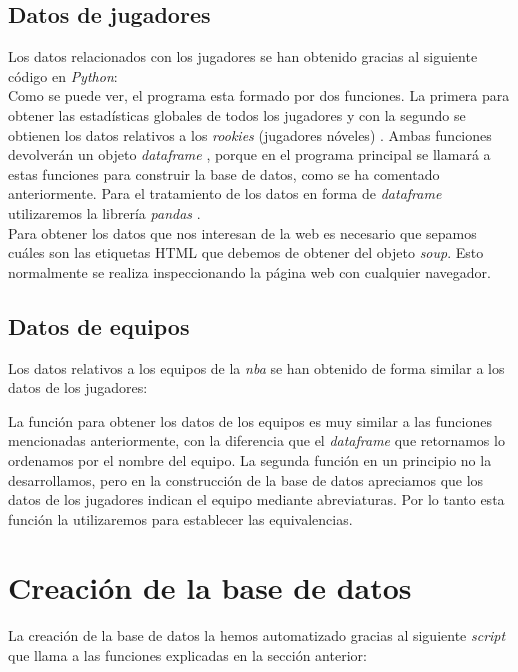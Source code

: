 \documentclass[11pt]{diazessay} %
\begin{document}
\subsection*{Datos de jugadores}
Los datos relacionados con los jugadores se han obtenido gracias al siguiente código \cite{web_scraping_nba} en \textit{Python}:\\



Como se puede ver, el programa esta formado por dos funciones. La primera para obtener las estadísticas globales de todos los jugadores \cite{players_data} y con la segundo se obtienen los datos relativos a los \textit{rookies} (jugadores nóveles) \cite{rookies_data}. Ambas funciones devolverán un objeto \textit{dataframe} \cite{dataframe}, porque en el programa principal se llamará a estas funciones para construir la base de datos, como se ha comentado anteriormente. Para el tratamiento de los datos en forma de \textit{dataframe} utilizaremos la librería \textit{pandas} \cite{pandas}.\\

Para obtener los datos que nos interesan de la web es necesario que sepamos cuáles son las etiquetas HTML que debemos de obtener del objeto \textit{soup}. Esto normalmente se realiza inspeccionando la página web con cualquier navegador.

\subsection*{Datos de equipos}
Los datos relativos a los equipos de la \textit{nba} se han obtenido de forma similar a los datos de los jugadores:



La función para obtener los datos de los equipos es muy similar a las funciones mencionadas anteriormente, con la diferencia que el \textit{dataframe} que retornamos lo ordenamos por el nombre del equipo. La segunda función en un principio no la desarrollamos, pero en la construcción de la base de datos apreciamos que los datos de los jugadores indican el equipo mediante abreviaturas. Por lo tanto esta función la utilizaremos para establecer las equivalencias.

\clearpage

\section*{Creación de la base de datos}
La creación de la base de datos la hemos automatizado gracias al siguiente \textit{script} que llama a las funciones explicadas en la sección anterior:
\end{document}
